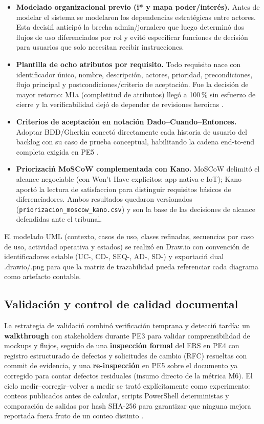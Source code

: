 \begin{itemize}[leftmargin=0.8cm]
  \item \textbf{Modelado organizacional previo (i* y mapa poder/inter\'es).} Antes de modelar el sistema se modelaron los dependencias estrat\'egicas entre actores. Esta decisi\'n anticip\'o la brecha admin/jornalero que luego determin\'o dos flujos de uso diferenciados por rol y evit\'o especificar funciones de decisi\'on para usuarios que solo necesitan recibir instrucciones.
  \item \textbf{Plantilla de ocho atributos por requisito.} Todo requisito nace con identificador \'unico, nombre, descripci\'on, actores, prioridad, precondiciones, flujo principal y postcondiciones/criterio de aceptaci\'on. Fue la decisi\'on de mayor retorno: M1a (completitud de atributos) lleg\'o a 100\,\% sin esfuerzo de cierre y la verificabilidad dej\'o de depender de revisiones heroicas \cite{iso29148}.
  \item \textbf{Criterios de aceptaci\'on en notaci\'on Dado--Cuando--Entonces.} Adoptar BDD/Gherkin conect\'o directamente cada historia de usuario del backlog con su caso de prueba conceptual, habilitando la cadena end-to-end completa exigida en PE5 \cite{ireb2026,hoyxu2023}.
  \item \textbf{Priorizaci\'n MoSCoW complementada con Kano.} MoSCoW delimit\'o el alcance negociable (con Won't Have explícitos: app nativa e IoT); Kano aport\'o la lectura de satisfaccion para distinguir requisitos b\'asicos de diferenciadores. Ambos resultados quedaron versionados (\texttt{priorizacion\_moscow\_kano.csv}) y son la base de las decisiones de alcance defendidas ante el tribunal.
\end{itemize}

El modelado UML (contexto, casos de uso, clases refinadas, secuencias por caso de uso, actividad operativa y estados) se realiz\'o en Draw.io con convenci\'on de identificadores estable (UC-, CD-, SEQ-, AD-, SD-) y exportaci\'n dual .drawio/.png para que la matriz de trazabilidad pueda referenciar cada diagrama como artefacto contable.

\subsection{Validaci\'on y control de calidad documental}

La estrategia de validaci\'n combin\'o verificaci\'on temprana y detecci\'n tard\'ia: un \textbf{walkthrough} con stakeholders durante PE3 para validar comprensibilidad de mockups y flujos, seguido de una \textbf{inspecci\'on formal} del ERS en PE4 con registro estructurado de defectos y solicitudes de cambio (RFC) resueltas con commit de evidencia, y una \textbf{re-inspecci\'on} en PE5 sobre el documento ya corregido para contar defectos residuales (insumo directo de la m\'etrica M6). El ciclo medir--corregir--volver a medir se trat\'o expl\'icitamente como experimento: conteos publicados antes de calcular, scripts PowerShell deterministas y comparaci\'on de salidas por hash SHA-256 para garantizar que ninguna mejora reportada fuera fruto de un conteo distinto \cite{wohlin2012,iso25010}.

